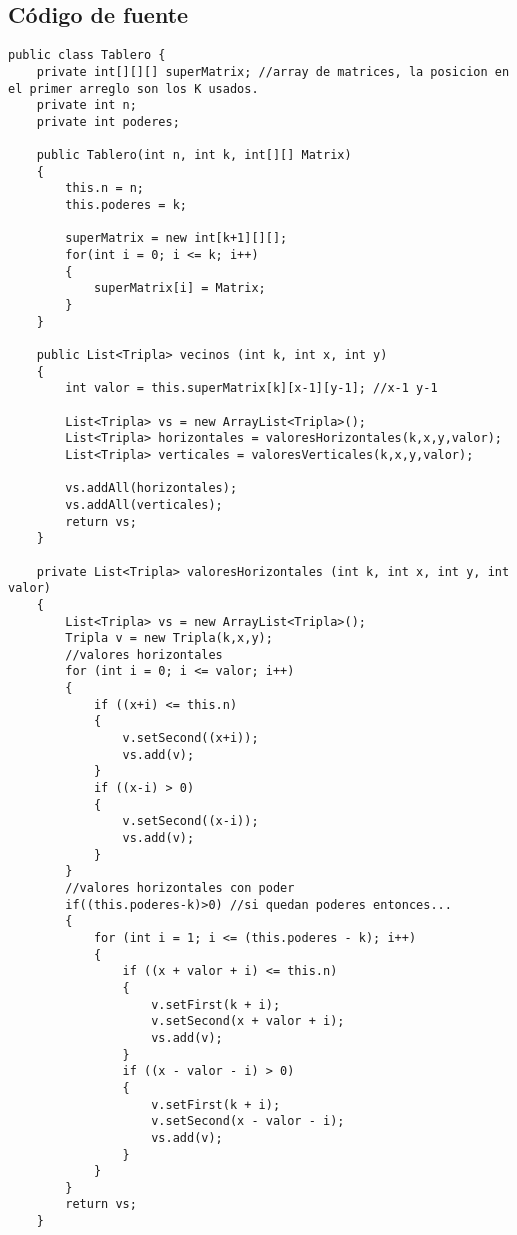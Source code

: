 
\subsection{C\'odigo de fuente}
\begin{verbatim}
public class Tablero {
    private int[][][] superMatrix; //array de matrices, la posicion en el primer arreglo son los K usados.
    private int n;
    private int poderes;

    public Tablero(int n, int k, int[][] Matrix)
    {
        this.n = n;
        this.poderes = k;

        superMatrix = new int[k+1][][];
        for(int i = 0; i <= k; i++)
        {
            superMatrix[i] = Matrix;
        }
    }

    public List<Tripla> vecinos (int k, int x, int y)
    {
        int valor = this.superMatrix[k][x-1][y-1]; //x-1 y-1

        List<Tripla> vs = new ArrayList<Tripla>();
        List<Tripla> horizontales = valoresHorizontales(k,x,y,valor);
        List<Tripla> verticales = valoresVerticales(k,x,y,valor);

        vs.addAll(horizontales);
        vs.addAll(verticales);
        return vs;
    }

    private List<Tripla> valoresHorizontales (int k, int x, int y, int valor)
    {
        List<Tripla> vs = new ArrayList<Tripla>();
        Tripla v = new Tripla(k,x,y);
        //valores horizontales
        for (int i = 0; i <= valor; i++)
        {
            if ((x+i) <= this.n)
            {
                v.setSecond((x+i));
                vs.add(v);
            }
            if ((x-i) > 0)
            {
                v.setSecond((x-i));
                vs.add(v);
            }
        }
        //valores horizontales con poder
        if((this.poderes-k)>0) //si quedan poderes entonces...
        {
            for (int i = 1; i <= (this.poderes - k); i++)
            {
                if ((x + valor + i) <= this.n)
                {
                    v.setFirst(k + i);
                    v.setSecond(x + valor + i);
                    vs.add(v);
                }
                if ((x - valor - i) > 0)
                {
                    v.setFirst(k + i);
                    v.setSecond(x - valor - i);
                    vs.add(v);
                }
            }
        }
        return vs;
    }


\end{verbatim}
